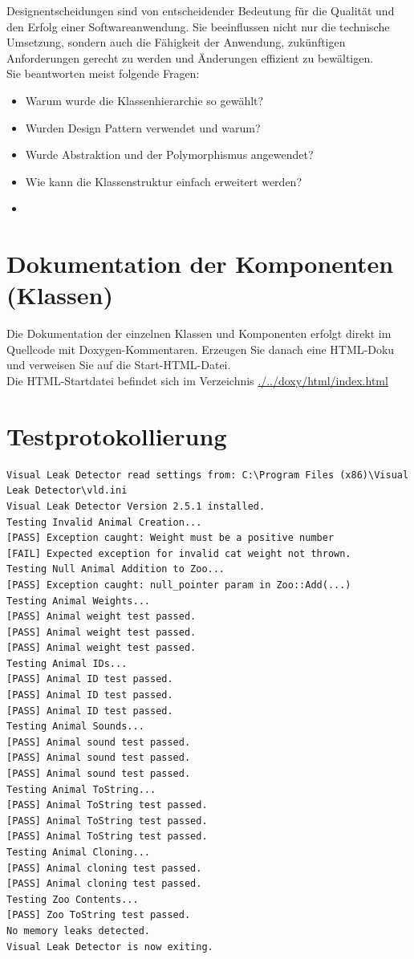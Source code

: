 \documentclass[12pt,naustrian,a4widepaper]{scrartcl}
\begin{document}
\color{blue}
Designentscheidungen sind von entscheidender Bedeutung für die Qualität und den Erfolg einer Softwareanwendung. Sie beeinflussen nicht nur die technische Umsetzung, sondern auch die Fähigkeit der Anwendung, zukünftigen Anforderungen gerecht zu werden und Änderungen effizient zu bewältigen.\\
Sie beantworten meist folgende Fragen:\\
\begin{itemize}
	\item Warum wurde die Klassenhierarchie so gewählt?
	\item Wurden Design Pattern verwendet und warum?
	\item Wurde Abstraktion und der Polymorphismus angewendet?
	\item Wie kann die Klassenstruktur einfach erweitert werden?
	\item 
\end{itemize}

\color{black}

\section{Dokumentation der Komponenten (Klassen)}
\color{blue}
Die Dokumentation der einzelnen Klassen und Komponenten erfolgt direkt im Quellcode mit Doxygen-Kommentaren. Erzeugen Sie danach 
eine HTML-Doku und verweisen Sie auf die Start-HTML-Datei.\\

\color{black}
Die HTML-Startdatei befindet sich im Verzeichnis \href{run:./../doxy/html/index.html}{./../doxy/html/index.html}

\clearpage
\section{Testprotokollierung}

\begin{verbatim}
Visual Leak Detector read settings from: C:\Program Files (x86)\Visual Leak Detector\vld.ini
Visual Leak Detector Version 2.5.1 installed.
Testing Invalid Animal Creation...
[PASS] Exception caught: Weight must be a positive number
[FAIL] Expected exception for invalid cat weight not thrown.
Testing Null Animal Addition to Zoo...
[PASS] Exception caught: null_pointer param in Zoo::Add(...)
Testing Animal Weights...
[PASS] Animal weight test passed.
[PASS] Animal weight test passed.
[PASS] Animal weight test passed.
Testing Animal IDs...
[PASS] Animal ID test passed.
[PASS] Animal ID test passed.
[PASS] Animal ID test passed.
Testing Animal Sounds...
[PASS] Animal sound test passed.
[PASS] Animal sound test passed.
[PASS] Animal sound test passed.
Testing Animal ToString...
[PASS] Animal ToString test passed.
[PASS] Animal ToString test passed.
[PASS] Animal ToString test passed.
Testing Animal Cloning...
[PASS] Animal cloning test passed.
[PASS] Animal cloning test passed.
Testing Zoo Contents...
[PASS] Zoo ToString test passed.
No memory leaks detected.
Visual Leak Detector is now exiting.
\end{verbatim}
\end{document}
